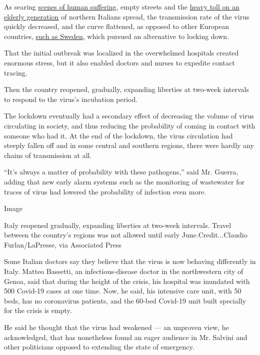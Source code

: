 As searing
\href{https://www.nytimes.com/2020/03/16/world/europe/italy-coronavirus-funerals.html}{scenes
of human suffering}, empty streets and the
\href{https://www.nytimes.com/2020/03/04/world/europe/coronavirus-italy-elderly.html}{heavy
toll on an elderly generation} of northern Italians spread, the
transmission rate of the virus quickly decreased, and the curve
flattened, as opposed to other European countries,
\href{https://www.nytimes.com/2020/07/07/business/sweden-economy-coronavirus.html}{such
as Sweden}, which pursued an alternative to locking down.

That the initial outbreak was localized in the overwhelmed hospitals
created enormous stress, but it also enabled doctors and nurses to
expedite contact tracing.

Then the country reopened, gradually, expanding liberties at two-week
intervals to respond to the virus's incubation period.

The lockdown eventually had a secondary effect of decreasing the volume
of virus circulating in society, and thus reducing the probability of
coming in contact with someone who had it. At the end of the lockdown,
the virus circulation had steeply fallen off and in some central and
southern regions, there were hardly any chains of transmission at all.

``It's always a matter of probability with these pathogens,'' said Mr.
Guerra, adding that new early alarm systems such as the monitoring of
wastewater for traces of virus had lowered the probability of infection
even more.

Image

Italy reopened gradually, expanding liberties at two-week intervals.
Travel between the country's regions was not allowed until early
June.Credit...Claudio Furlan/LaPresse, via Associated Press

Some Italian doctors say they believe that the virus is now behaving
differently in Italy. Matteo Bassetti, an infectious-disease doctor in
the northwestern city of Genoa, said that during the height of the
crisis, his hospital was inundated with 500 Covid-19 cases at one time.
Now, he said, his intensive care unit, with 50 beds, has no coronavirus
patients, and the 60-bed Covid-19 unit built specially for the crisis is
empty.

He said he thought that the virus had weakened --- an unproven view, he
acknowledged, that has nonetheless found an eager audience in Mr.
Salvini and other politicians opposed to extending the state of
emergency.

